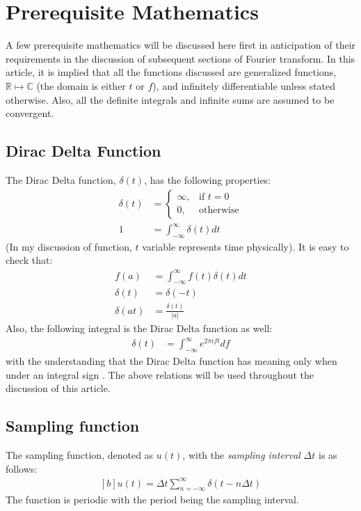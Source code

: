 \documentclass[letterpaper, 11pt]{article}
\newcommand{\fint}{\int_{-\infty}^{\infty}} %
\newcommand{\fsum}[1]{\sum_{#1 = -\infty}^{\infty}} %
\newcommand{\spf}[2]{\Delta #1 \fsum{#2} \delta (#1 - #2 \Delta #1)} %
\newcommand{\ift}[3]{\fint #2 e^{2\pi i#1#3} d#1} %
\numberwithin{equation}{section}
\numberwithin{figure}{section}
\numberwithin{table}{section}
\begin{document}
\pagestyle{fancy}

\section{Prerequisite Mathematics}
A few prerequisite mathematics will be discussed here first in anticipation of their requirements in the discussion of subsequent sections of Fourier transform. In this article, it is implied that all the functions discussed are generalized functions, \(\mathbb{R} \mapsto \mathbb{C} \) (the domain is either \(t\) or \(f\)), and infinitely differentiable unless stated otherwise. Also, all the definite integrals and infinite sums are assumed to be convergent.  

\subsection{Dirac Delta Function}
The Dirac Delta function, \(\delta (t)\), has the following properties:
\begin{align}
	\delta (t)	&=\begin{cases}
			\infty, & \text{if } t = 0 \\
			0,	& \text{otherwise}
	\end{cases}\\
		1	&= \fint \delta (t) dt
\end{align}
(In my discussion of function, \(t\) variable represents time physically). It is easy to check that:
\begin{align}
	f(a)		&= \fint f(t) \delta (t) dt\\
	\delta (t)	&= \delta (-t)\\
	\delta (at)	&= \frac{\delta (t)}{|a|}
\end{align}
Also, the following integral is the Dirac Delta function as well:
\begin{align}
	\delta (t)	&= \ift{f}{}{t}
	\label{eq:dirac}
\end{align}
with the understanding that the Dirac Delta function has meaning only when under an integral sign \cite{arfken}. The above relations will be used throughout the discussion of this article.


\subsection{Sampling function}
The sampling function, denoted as \(u(t)\), with the \emph{sampling interval} \(\Delta t\)  is as follows:
\begin{equation}
	\begin{aligned}[b]
		u(t) = \spf{t}{n}
	\end{aligned}
\end{equation}
The function is periodic with the period being the sampling interval. 
\end{document}

